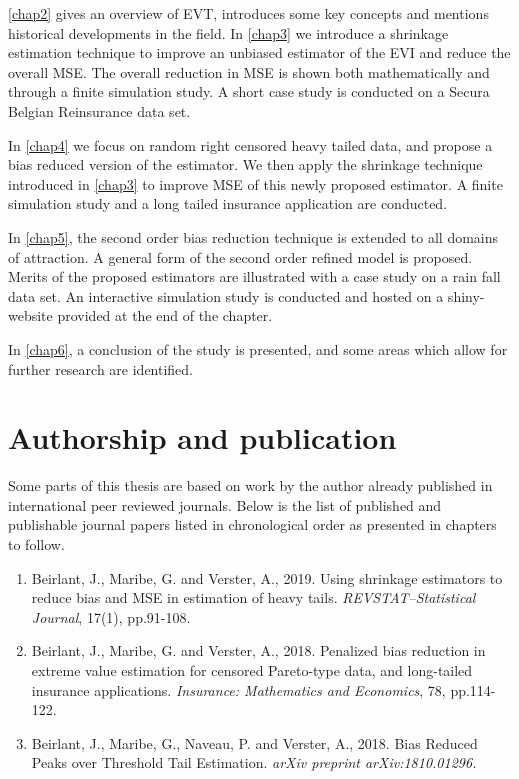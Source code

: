 \autoref{chap2} gives an overview of EVT, introduces some key concepts and mentions historical developments in the field. 
In \autoref{chap3} we introduce a shrinkage estimation technique to improve an unbiased estimator of the EVI and reduce the overall MSE. The overall reduction in MSE is shown both mathematically and through a finite simulation study. A short case study is conducted on a Secura Belgian Reinsurance data set.

In \autoref{chap4} we focus on random right censored heavy tailed data, and propose a bias reduced version of the \cite{worms2014new} estimator. We then apply the shrinkage technique introduced in \autoref{chap3} to improve MSE of this newly proposed estimator. A finite simulation study and a long tailed insurance application are conducted.

In \autoref{chap5}, the second order bias reduction technique is extended to all domains of attraction. A general form of the second order refined model is proposed. Merits of the proposed estimators are illustrated with a case study on a rain fall data set. An interactive simulation study is conducted and hosted on a shiny-website provided at the end of the chapter.

In \autoref{chap6}, a conclusion of the study is presented, and some areas which allow for further research are identified.
\newpage

\section{Authorship and publication}
Some parts of this thesis are based on work by the author already published in international peer reviewed journals. Below is the list of published and publishable journal papers listed in chronological order as presented in chapters to follow.

\begin{enumerate}
    \item Beirlant, J., Maribe, G. and Verster, A., 2019. Using shrinkage estimators to reduce bias and MSE in estimation of heavy tails. \textit{REVSTAT–Statistical Journal}, 17(1), pp.91-108.
    
    \item Beirlant, J., Maribe, G. and Verster, A., 2018. Penalized bias reduction in extreme value estimation for censored Pareto-type data, and long-tailed insurance applications.\textit{ Insurance: Mathematics and Economics}, 78, pp.114-122.
    
    \item Beirlant, J., Maribe, G., Naveau, P. and Verster, A., 2018. Bias Reduced Peaks over Threshold Tail Estimation. \textit{arXiv preprint arXiv:1810.01296.}
\end{enumerate}
\nocite{beirlant2017using}
\nocite{beirlant2018penalized}
\nocite{beirlant2018bias}